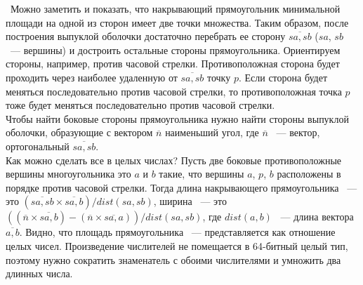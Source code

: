 \indent\indent\ Можно заметить и показать, что накрывающий
прямоугольник минимальной площади на одной из сторон
имеет две точки множества. Таким образом, после построения выпуклой оболочки
достаточно перебрать ее сторону $\overline{sa,sb}$
($sa$, $sb$ ~--- вершины) и достроить остальные стороны
прямоугольника. Ориентируем стороны, например,
против часовой стрелки. Противоположная сторона будет проходить
через наиболее удаленную от $\overline{sa,sb}$ точку $p$.
Если сторона будет меняться
последовательно против часовой стрелки, то противоположная точка $p$ тоже
будет меняться последовательно против часовой стрелки.\\
Чтобы найти боковые стороны прямоугольника нужно найти стороны
выпуклой оболочки, образующие с вектором $\overline{n}$ наименьший угол,
где $\overline{n}$ ~--- вектор, ортогональный $\overline{sa,sb}$.\\

Как можно сделать все в целых числах? Пусть две боковые
противоположные вершины многоугольника это $a$ и $b$ такие,
что вершины $a$, $p$, $b$ расположены в порядке против часовой
стрелки. Тогда длина накрывающего прямоугольника ~---
это $(\overline{sa,sb} \times \overline{sa,b}) / dist(sa, sb)$,
ширина ~--- это
$((\overline{n} \times \overline{sa,b})
- (\overline{n} \times \overline{sa,a})) / dist(sa, sb)$,
где $dist(a, b)$ ~--- длина вектора $\overline{a,b}$. Видно, что
площадь прямоугольника ~--- представляется как отношение
целых чисел. Произведение числителей не помещается в 64-битный
целый тип, поэтому нужно сократить знаменатель с обоими числителями
и умножить два длинных числа.
